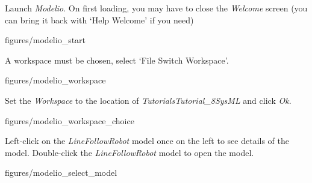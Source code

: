 \documentclass[11pt,a4paper]{../tutorial}
\begin{document}
\begin{instructions}

\item Launch \emph{Modelio}. On first loading, you may have to close the \emph{Welcome} screen (you can bring it back with `Help \menusep Welcome' if you need)

\begin{center}
\begin{annotation}[width=1\linewidth,trim=0 400 0 0,clip]{figures/modelio_start}
    \end{annotation}
\end{center}

\item A workspace must be chosen, select `File \menusep Switch Workspace’.

\begin{center}
\begin{annotation}[width=1\linewidth,trim=0 700 0 0,clip]{figures/modelio_workspace}
    \end{annotation}
\end{center}


\newpage

\item Set the \emph{Workspace} to the location of \emph{Tutorials\pathsep{}Tutorial\_8\pathsep{}SysML} and click \emph{Ok}.

\begin{center}
\begin{annotation}[width=0.5\linewidth,trim=0 0 0 0,clip]{figures/modelio_workspace_choice}
    \end{annotation}
\end{center}


\item Left-click on the \emph{LineFollowRobot} model once on the left to see details of the model. Double-click the \emph{LineFollowRobot} model to open the model.

\begin{center}
\begin{annotation}[width=1\linewidth,trim=0 300 0 0,clip]{figures/modelio_select_model}
    \end{annotation}
\end{center}

\end{instructions}
\end{document}
